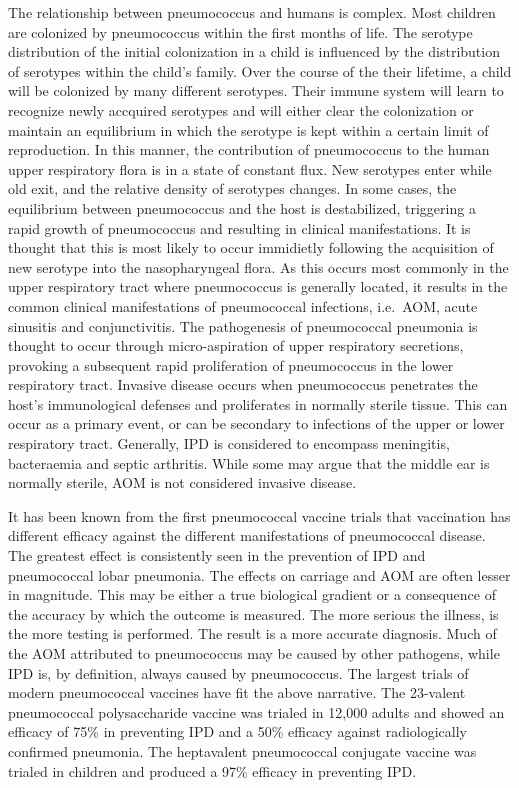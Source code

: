 \documentclass[]{book}
\theoremstyle{definition}
\theoremstyle{definition}
\theoremstyle{definition}
\theoremstyle{remark}
\begin{document}
The relationship between pneumococcus and humans is complex. Most
children are colonized by pneumococcus within the first months of life.
The serotype distribution of the initial colonization in a child is
influenced by the distribution of serotypes within the child's family.
Over the course of the their lifetime, a child will be colonized by many
different serotypes. Their immune system will learn to recognize newly
accquired serotypes and will either clear the colonization or maintain
an equilibrium in which the serotype is kept within a certain limit of
reproduction. In this manner, the contribution of pneumococcus to the
human upper respiratory flora is in a state of constant flux. New
serotypes enter while old exit, and the relative density of serotypes
changes. In some cases, the equilibrium between pneumococcus and the
host is destabilized, triggering a rapid growth of pneumococcus and
resulting in clinical manifestations. It is thought that this is most
likely to occur immidietly following the acquisition of new serotype
into the nasopharyngeal flora. As this occurs most commonly in the upper
respiratory tract where pneumococcus is generally located, it results in
the common clinical manifestations of pneumococcal infections, i.e.~AOM,
acute sinusitis and conjunctivitis. The pathogenesis of pneumococcal
pneumonia is thought to occur through micro-aspiration of upper
respiratory secretions, provoking a subsequent rapid proliferation of
pneumococcus in the lower respiratory tract. Invasive disease occurs
when pneumococcus penetrates the host's immunological defenses and
proliferates in normally sterile tissue. This can occur as a primary
event, or can be secondary to infections of the upper or lower
respiratory tract. Generally, IPD is considered to encompass meningitis,
bacteraemia and septic arthritis. While some may argue that the middle
ear is normally sterile, AOM is not considered invasive disease.

It has been known from the first pneumococcal vaccine trials that
vaccination has different efficacy against the different manifestations
of pneumococcal disease. The greatest effect is consistently seen in the
prevention of IPD and pneumococcal lobar pneumonia. The effects on
carriage and AOM are often lesser in magnitude. This may be either a
true biological gradient or a consequence of the accuracy by which the
outcome is measured. The more serious the illness, is the more testing
is performed. The result is a more accurate diagnosis. Much of the AOM
attributed to pneumococcus may be caused by other pathogens, while IPD
is, by definition, always caused by pneumococcus. The largest trials of
modern pneumococcal vaccines have fit the above narrative. The 23-valent
pneumococcal polysaccharide vaccine was trialed in 12,000 adults and
showed an efficacy of 75\% in preventing IPD and a 50\% efficacy against
radiologically confirmed pneumonia. The heptavalent pneumococcal
conjugate vaccine was trialed in children and produced a 97\% efficacy
in preventing IPD.
\end{document}
